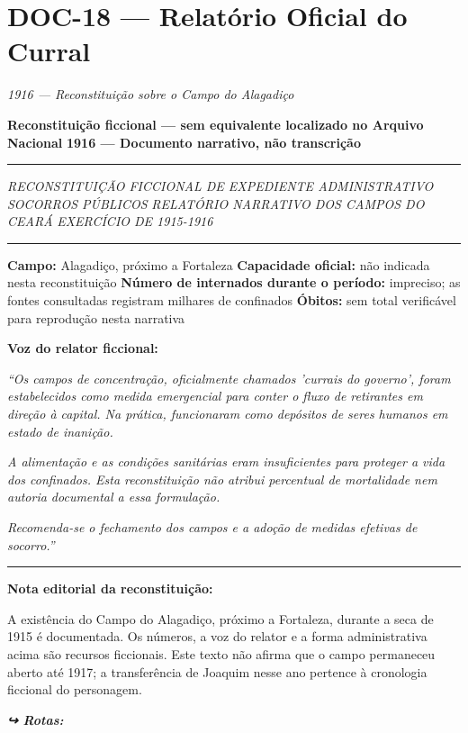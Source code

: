 \section*{\textbf{DOC-18} --- Relatório Oficial do Curral}

\noindent \textit{1916 --- Reconstituição sobre o Campo do Alagadiço}

\noindent \textbf{Reconstituição ficcional --- sem equivalente localizado no Arquivo Nacional}
\textbf{1916 --- Documento narrativo, não transcrição}

\vspace{0.5em}\noindent\rule{\textwidth}{0.5pt}\vspace{0.5em}

\noindent \textit{RECONSTITUIÇÃO FICCIONAL DE EXPEDIENTE ADMINISTRATIVO}
\textit{SOCORROS PÚBLICOS}
\textit{RELATÓRIO NARRATIVO DOS CAMPOS DO CEARÁ}
\textit{EXERCÍCIO DE 1915-1916}

\vspace{0.5em}\noindent\rule{\textwidth}{0.5pt}\vspace{0.5em}

\noindent \textbf{Campo:} Alagadiço, próximo a Fortaleza
\textbf{Capacidade oficial:} não indicada nesta reconstituição
\textbf{Número de internados durante o período:} impreciso; as fontes consultadas registram milhares de confinados
\textbf{Óbitos:} sem total verificável para reprodução nesta narrativa

\noindent \textbf{Voz do relator ficcional:}

\noindent \textit{\textquotedblleft{}Os campos de concentração, oficialmente chamados 'currais do governo', foram estabelecidos como medida emergencial para conter o fluxo de retirantes em direção à capital. Na prática, funcionaram como depósitos de seres humanos em estado de inanição.}

\noindent \textit{A alimentação e as condições sanitárias eram insuficientes para proteger a vida dos confinados. Esta reconstituição não atribui percentual de mortalidade nem autoria documental a essa formulação.}

\noindent \textit{Recomenda-se o fechamento dos campos e a adoção de medidas efetivas de socorro.\textquotedblright{}}

\vspace{0.5em}\noindent\rule{\textwidth}{0.5pt}\vspace{0.5em}

\noindent \textbf{Nota editorial da reconstituição:}

\noindent A existência do Campo do Alagadiço, próximo a Fortaleza, durante a seca de 1915 é documentada. Os números, a voz do relator e a forma administrativa acima são recursos ficcionais. Este texto não afirma que o campo permaneceu aberto até 1917; a transferência de Joaquim nesse ano pertence à cronologia ficcional do personagem.

\vspace{0.5em}
\noindent\textit{\textbf{↪ Rotas:}  \rotasep {}}